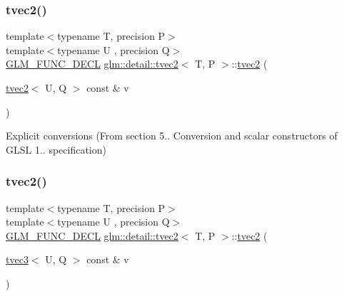 \subsubsection{\texorpdfstring{tvec2()}{tvec2()}\hspace{0.1cm}{\footnotesize\ttfamily [8/15]}}
{\footnotesize\ttfamily template$<$typename T, precision P$>$ \\
template$<$typename U , precision Q$>$ \\
\hyperlink{setup_8hpp_ab2d052de21a70539923e9bcbf6e83a51}{G\+L\+M\+\_\+\+F\+U\+N\+C\+\_\+\+D\+E\+CL} \hyperlink{structglm_1_1detail_1_1tvec2}{glm\+::detail\+::tvec2}$<$ T, P $>$\+::\hyperlink{structglm_1_1detail_1_1tvec2}{tvec2} (\begin{DoxyParamCaption}\item[{\hyperlink{structglm_1_1detail_1_1tvec2}{tvec2}$<$ U, Q $>$ const \&}]{v }\end{DoxyParamCaption})}



Explicit conversions (From section 5.. Conversion and scalar constructors of G\+L\+SL 1.. specification) 

\mbox{\label{structglm_1_1detail_1_1tvec2_a79d0d9907539559a9c5cea20a57ad669}} 
\subsubsection{\texorpdfstring{tvec2()}{tvec2()}\hspace{0.1cm}{\footnotesize\ttfamily [9/15]}}
{\footnotesize\ttfamily template$<$typename T, precision P$>$ \\
template$<$typename U , precision Q$>$ \\
\hyperlink{setup_8hpp_ab2d052de21a70539923e9bcbf6e83a51}{G\+L\+M\+\_\+\+F\+U\+N\+C\+\_\+\+D\+E\+CL} \hyperlink{structglm_1_1detail_1_1tvec2}{glm\+::detail\+::tvec2}$<$ T, P $>$\+::\hyperlink{structglm_1_1detail_1_1tvec2}{tvec2} (\begin{DoxyParamCaption}\item[{\hyperlink{structglm_1_1detail_1_1tvec3}{tvec3}$<$ U, Q $>$ const \&}]{v }\end{DoxyParamCaption})\hspace{0.3cm}{\ttfamily [explicit]}}



